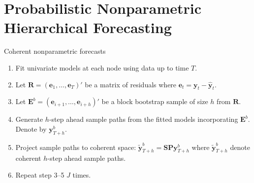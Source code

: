 \documentclass[14pt]{beamer}
\def\bS{\bm{S}}
\def\by{\bm{y}}
\begin{document}
\section{Probabilistic Nonparametric Hierarchical Forecasting}

\begin{frame}{Coherent nonparametric forecasts}
\begin{enumerate}
  \item Fit univariate models at each node using data up to time $T$.
  \item Let $\bm{R} = (\bm{e}_1,\dots,\bm{e}_T)'$ be a matrix of residuals where $\bm{e}_t=\bm{y}_t-\hat{\bm{y}}_t$.
  \item Let $\bm{E}^b = (\bm{e}_{i+1},\dots,\bm{e}_{i+h})'$ be a block bootstrap sample of size $h$ from $\bm{R}$.
  \item Generate $h$-step ahead sample paths from the fitted models incorporating $\bm{E}^b$. Denote by $\bm{y}_{T+h}^b$.
  \item Project sample paths to coherent space: $\tilde{\bm{y}}_{T+h}^b = \bS\bm{P}\by_{T+h}^b$ where $\tilde{\bm{y}}_{T+h}^b$ denote coherent $h$-step ahead sample paths.
  \item Repeat step 3--5 $J$ times.
\end{enumerate}
\end{frame}
\end{document}
